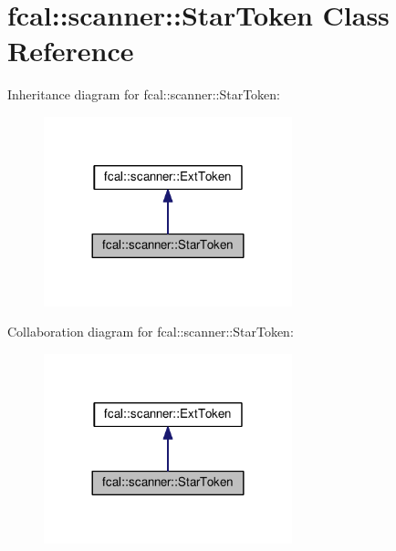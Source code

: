 \hypertarget{classfcal_1_1scanner_1_1StarToken}{}\section{fcal\+:\+:scanner\+:\+:Star\+Token Class Reference}
\label{classfcal_1_1scanner_1_1StarToken}


Inheritance diagram for fcal\+:\+:scanner\+:\+:Star\+Token\+:\nopagebreak
\begin{figure}[H]
\begin{center}
\leavevmode
\includegraphics[width=204pt]{classfcal_1_1scanner_1_1StarToken__inherit__graph}
\end{center}
\end{figure}


Collaboration diagram for fcal\+:\+:scanner\+:\+:Star\+Token\+:\nopagebreak
\begin{figure}[H]
\begin{center}
\leavevmode
\includegraphics[width=204pt]{classfcal_1_1scanner_1_1StarToken__coll__graph}
\end{center}
\end{figure}
